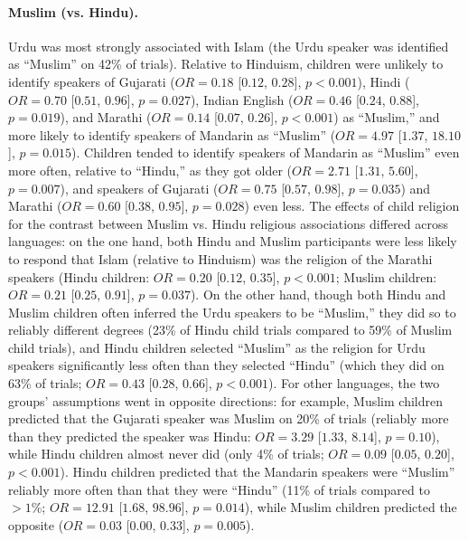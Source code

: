 \documentclass{foushee-adapted-preprint}
\begin{document}
\paragraph{Muslim (vs. Hindu).} 
Urdu was most strongly associated with Islam (the Urdu speaker was identified as ``Muslim'' on 42\% of trials). 
Relative to Hinduism, children were unlikely to identify speakers of Gujarati ($OR=0.18$ [$0.12$, $0.28$], $p<0.001$), Hindi ($OR=0.70$ [$0.51$, $0.96$], $p=0.027$), Indian English ($OR=0.46$ [$0.24$, $0.88$], $p=0.019$), and Marathi ($OR=0.14$ [$0.07$, $0.26$], $p<0.001$) as ``Muslim,'' and more likely to identify speakers of Mandarin as ``Muslim'' ($OR=4.97$ [$1.37$, $18.10$], $p=0.015$). 
Children tended to identify speakers of Mandarin as ``Muslim'' even more often, relative to ``Hindu,'' as they got older ($OR=2.71$ [$1.31$, $5.60$], $p=0.007$), and speakers of Gujarati ($OR=0.75$ [$0.57$, $0.98$], $p=0.035$) and Marathi ($OR=0.60$ [$0.38$, $0.95$], $p=0.028$) even less. %
The effects of child religion for the contrast between Muslim vs. Hindu religious associations differed across languages: on the one hand, both Hindu and Muslim participants were less likely to respond that Islam (relative to Hinduism) was the religion of the Marathi speakers (Hindu children: $OR=0.20$ [$0.12$, $0.35$], $p<0.001$; Muslim children: $OR=0.21$ [$0.25$, $0.91$], $p=0.037$). 
On the other hand, though both Hindu and Muslim children often inferred the Urdu speakers to be ``Muslim,'' they did so to reliably different degrees (23\% of Hindu child trials compared to 59\% of Muslim child trials), and Hindu children selected ``Muslim'' as the religion for Urdu speakers significantly less often than they selected ``Hindu'' (which they did on 63\% of trials; $OR=0.43$ [$0.28$, $0.66$], $p<0.001$). 
For other languages, the two groups' assumptions went in opposite directions: for example, 
Muslim children predicted that the Gujarati speaker was Muslim on 20\% of trials (reliably more than they predicted the speaker was Hindu: $OR=3.29$ [$1.33$, $8.14$], $p=0.10$), while Hindu children almost never did (only 4\% of trials; $OR=0.09$ [$0.05$, $0.20$], $p<0.001$). 
Hindu children predicted that the Mandarin speakers were ``Muslim'' reliably more often than that they were ``Hindu'' (11\% of trials compared to $>1\%$; $OR=12.91$ [$1.68$, $98.96$], $p=0.014$), while Muslim children predicted the opposite ($OR=0.03$ [$0.00$, $0.33$], $p=0.005$).
\end{document}
